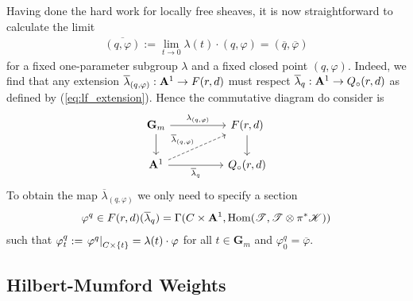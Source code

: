 \documentclass[12pt]{ociamthesis}  %
\begin{document}
\begin{example}
  Having done the hard work for locally free sheaves, it is now
  straightforward to calculate the limit
  \begin{align}\label{eq:higgs_limit}
    \overline{(q,\varphi)}:=\lim_{t\to 0} \lambda(t)\cdot (q,\varphi) = (\overline q,\overline\varphi)
  \end{align}
  for a fixed one-parameter subgroup $\lambda$ and a fixed closed point
  $(q,\varphi)$. Indeed, we find that any extension
  $\overline{\lambda}_{(q,\varphi)}:\mathbf{A}^{1}_{}\to F(r,d)$ must
  respect $\overline{\lambda}_q:\mathbf{A}^{1}_{}\to Q_\circ(r,d)$
  as defined by (\ref{eq:lf_extension}). Hence the commutative
  diagram do consider is
  \begin{equation*}
    \begin{tikzcd}
      {\mathbf G_m} && {F(r,d)} \\
      {\mathbf A^1} && {Q_\circ(r,d)}
      \arrow["{\lambda_{(q,\varphi)}}", from=1-1, to=1-3]
      \arrow[from=1-1, to=2-1]
      \arrow[from=1-3, to=2-3]
      \arrow["{\overline{\lambda}_{(q,\varphi)}}", dashed, from=2-1, to=1-3]
      \arrow["{\overline{\lambda}_q}"', from=2-1, to=2-3]
    \end{tikzcd}
  \end{equation*}
  To obtain the map $\overline{\lambda}_{(q,\varphi)}$ we only need
  to specify a section
  \begin{align*}
    \varphi^q\in F(r,d)(\overline \lambda_q)
    = \Gamma(C\times\mathbf A^1,\operatorname{Hom}(\mathscr T,\mathscr T\otimes \pi^*\mathscr K))
  \end{align*}
  such that $\varphi^q_t := \left.{\varphi^q}\right\vert_{C\times\{t\}} = \lambda(t)\cdot\varphi$
  for all $t\in\mathbf G_m$ and $\varphi^q_0 = \overline{\varphi}$.

  \missingexample
\end{example}

\subsection{Hilbert-Mumford Weights}

\end{document}
